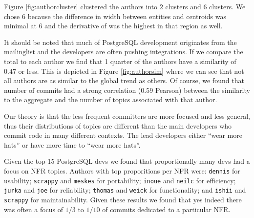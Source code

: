 \documentclass[smallextended]{svjour3}       %
\begin{document}
Figure \ref{fig:authorcluster} clustered the authors into $2$ clusters
and $6$ clusters. We chose $6$ because the difference in width between
entities and centroids was minimal at $6$ and the derivative of was
the highest in that region as well.

It should be noted that much of PostgreSQL development originates from
the mailinglist and the developers are often pushing integrations. If
we compare the total to each author we find that 1 quarter of the
authors have a similarity of $0.47$ or less. This is depicted in
Figure \ref{fig:authorsim} where we can see that not all authors are
as similar to the global trend as others. Of
course, we found that number of commits had a strong correlation
($0.59$ Pearson) between the similarity to the aggregate and the
number of topics associated with that author.

Our theory is that the less frequent committers are more
focused and less general, thus their distributions of topics are
different than the main developers who commit code in many different
contexts.  The lead developers either ``wear more hats'' or have more
time to ``wear more hats''.

Given the top 15 PostgreSQL devs we found that proportionally many
devs had a focus on NFR topics. Authors with top proporitions per NFR
were:
\texttt{dennis} for usability; 
\texttt{scrappy} and \texttt{meskes} for portability;
\texttt{inoue} and \texttt{neilc} for efficiency;
\texttt{jurka} and \texttt{joe} for reliability;
\texttt{thomas} and \texttt{weick} for functionality;
and \texttt{ishii} and \texttt{scrappy} for maintainability.
Given these results we found that yes indeed there was often a focus
of $1/3$ to $1/10$ of commits dedicated to a particular NFR.



\end{document}

